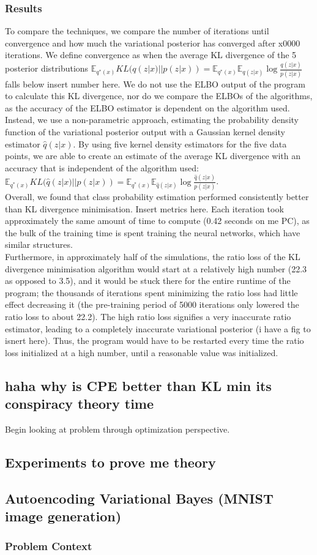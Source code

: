 \documentclass[a4paper,12pt]{article}
\newcommand{\E}{\mathbb{E}}
\numberwithin{equation}{section}
\begin{document}
\subsubsection{Results}
To compare the techniques, we compare the number of iterations until convergence and how much the variational posterior has converged after x0000 iterations. We define convergence as when the average KL divergence of the 5 posterior distributions $\E_{q^*(x)}KL(q(z|x)||p(z|x)) = \E_{q^*(x)}\E_{q(z|x)}\log \frac{q(z|x)}{p(z|x)}$ falls below insert number here. We do not use the ELBO output of the program to calculate this KL divergence, nor do we compare the ELBOs of the algorithms, as the accuracy of the ELBO estimator is dependent on the algorithm used. Instead, we use a non-parametric approach, estimating the probability density function of the variational posterior output with a Gaussian kernel density estimator $\hat{q}(z|x)$. By using five kernel density estimators for the five data points, we are able to create an estimate of the average KL divergence with an accuracy that is independent of the algorithm used: $\E_{q^*(x)}KL(\hat{q}(z|x)||p(z|x)) = \E_{q^*(x)}\E_{\hat{q}(z|x)}\log \frac{\hat{q}(z|x)}{p(z|x)}$.\\
Overall, we found that class probability estimation performed consistently better than KL divergence minimisation. Insert metrics here. Each iteration took approximately the same amount of time to compute (0.42 seconds on me PC), as the bulk of the training time is spent training the neural networks, which have similar structures.\\
Furthermore, in approximately half of the simulations, the ratio loss of the KL divergence minimisation algorithm would start at a relatively high number (22.3 as opposed to 3.5), and it would be stuck there for the entire runtime of the program; the thousands of iterations spent minimizing the ratio loss had little effect decreasing it (the pre-training period of 5000 iterations only lowered the ratio loss to about 22.2). The high ratio loss signifies a very inaccurate ratio estimator, leading to a completely inaccurate variational posterior (i have a fig to isnert here). Thus, the program would have to be restarted every time the ratio loss initialized at a high number, until a reasonable value was initialized.
\subsection{haha why is CPE better than KL min its conspiracy theory time}
Begin looking at problem through optimization perspective.
\subsection{Experiments to prove me theory}
\subsection{Autoencoding Variational Bayes (MNIST image generation)}
\subsubsection{Problem Context}
\end{document}
